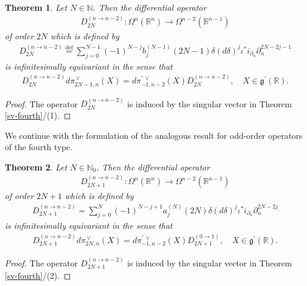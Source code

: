 \documentclass[a4paper,12pt,reqno]{amsart}
\newtheorem{theorem}{Theorem}
\numberwithin{theorem}{subsection}
\numberwithin{equation}{section}
\begin{document}
\begin{theorem}\label{DO4-Even} Let $N\in{\mathbb{N}}$. Then the differential operator
\begin{align*}
   D_{2N}^{(n\to n-2)}: \Omega^n({\mathbb{R}}^n)\to \Omega^{n-2}({\mathbb{R}}^{n-1})
\end{align*}
of order $2N$ which is defined by
\begin{align*}
   D_{2N}^{(n\to n-2)} {\stackrel{\text{def}}{=}} \sum_{j=0}^{N-1}(-1)^{N-j} b_j^{(N-1)}(2N\!-\!1)
   \delta ({d}\delta)^j \iota^*i_{\partial_n}\partial_n^{2N-2j-1}
\end{align*}
is infinitesimally equivariant in the sense that
\begin{align*}
   D_{2N}^{(n\to n-2)} {d}\pi^{{\,\vee}}_{2N-1,n}(X)
   ={d}\pi^{\prime{{\,\vee}}}_{-1,n-2}(X) D^{(n\to n-2)}_{2N},\quad X\in{{\mathfrak g}}^\prime({\mathbb{R}}).
\end{align*}
\end{theorem}

\begin{proof} The operator $D_{2N}^{(n\to n-2)}$ is induced by the singular vector in Theorem
\ref{sv-fourth}/(1).
\end{proof}

We continue with the formulation of the analogous result for odd-order
operators of the fourth type.

\begin{theorem}\label{DO4-Odd} Let $N\in{\mathbb{N}}_0$. Then the differential operator
\begin{align*}
   D_{2N+1}^{(n\to n-2)}:\Omega^n({\mathbb{R}}^n)\to \Omega^{n-2}({\mathbb{R}}^{n-1})
\end{align*}
of order $2N+1$ which is defined by
\begin{align*}
   D_{2N+1}^{(n\to n-2)}=\sum_{j=0}^{N}(-1)^{N-j+1} a_j^{(N)}(2N)
   \delta ({d}\delta)^{j}\iota^*i_{\partial_n}\partial_n^{2N-2j}
\end{align*}
is infinitesimally equivariant in the sense that
\begin{align*}
   D_{2N+1}^{(n\to n-2)}{d}\pi^{{\,\vee}}_{2N,n}(X)
   ={d}\pi^{\prime{{\,\vee}}}_{-1,n-2}(X) D^{(0\to 1)}_{2N+1},\quad X\in{{\mathfrak g}}^\prime({\mathbb{R}}).
\end{align*}
\end{theorem}

\begin{proof} The operator $D_{2N+1}^{(n\to n-2)}$ is induced by the singular vector in Theorem
\ref{sv-fourth}/(2).
\end{proof}
\end{document}
